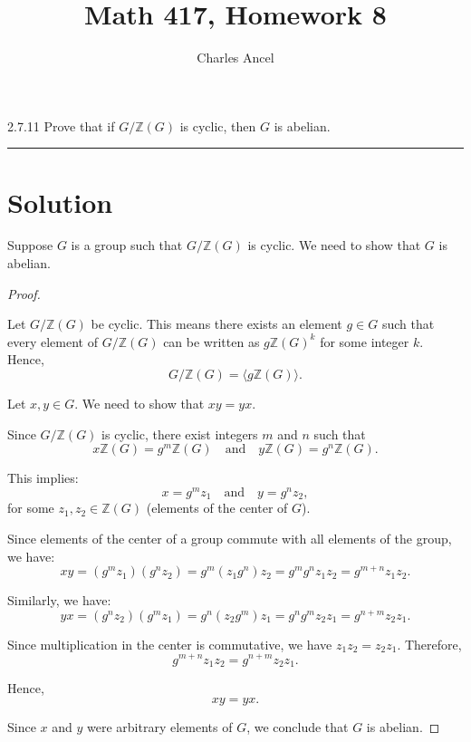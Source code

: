 \documentclass[12pt]{amsart}
\title{Math 417, Homework 8}
\author{Charles Ancel}
\theoremstyle{definition}
\numberwithin{equation}{section}
\newcommand{\Z}{\mathbb{Z}}
\begin{document}
\maketitle

\begin{exercise}{2.7.11} Prove that if \(G/\Z(G)\) is cyclic, then $G$ is abelian. 

    \noindent\rule{\linewidth}{1pt}

    \section*{Solution}
    
    Suppose \(G\) is a group such that \(G/\Z(G)\) is cyclic. We need to show that \(G\) is abelian.
    
    \begin{proof} \( \)
    
    Let \(G/\Z(G)\) be cyclic. This means there exists an element \(g \in G\) such that every element of \(G/\Z(G)\) can be written as \(g\Z(G)^k\) for some integer \(k\). Hence, 
    \[
    G/\Z(G) = \langle g\Z(G) \rangle.
    \]
    
    Let \(x, y \in G\). We need to show that \(xy = yx\).

    Since \(G/\Z(G)\) is cyclic, there exist integers \(m\) and \(n\) such that 
    \[
    x\Z(G) = g^m\Z(G) \quad \text{and} \quad y\Z(G) = g^n\Z(G).
    \]
    
    This implies:
    \[
    x = g^m z_1 \quad \text{and} \quad y = g^n z_2,
    \]
    for some \(z_1, z_2 \in \Z(G)\) (elements of the center of \(G\)).

    Since elements of the center of a group commute with all elements of the group, we have:
    \[
    x y = (g^m z_1)(g^n z_2) = g^m (z_1 g^n) z_2 = g^m g^n z_1 z_2 = g^{m+n} z_1 z_2.
    \]

    Similarly, we have:
    \[
    y x = (g^n z_2)(g^m z_1) = g^n (z_2 g^m) z_1 = g^n g^m z_2 z_1 = g^{n+m} z_2 z_1.
    \]
    
    Since multiplication in the center is commutative, we have \(z_1 z_2 = z_2 z_1\). Therefore,
    \[
    g^{m+n} z_1 z_2 = g^{n+m} z_2 z_1.
    \]
    
    Hence,
    \[
    x y = y x.
    \]

    Since \(x\) and \(y\) were arbitrary elements of \(G\), we conclude that \(G\) is abelian.
    
    \end{proof}
    
\end{exercise}
\newpage
\end{document}

